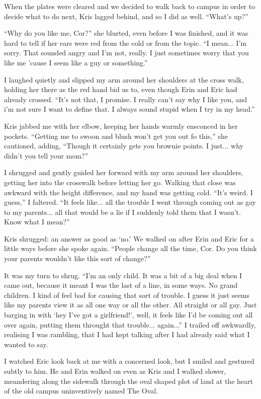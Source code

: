 When the plates were cleared and we decided to walk back to campus in order to decide what to do next, Kris lagged behind, and so I did as well.  ``What's up?''

``Why do you like me, Cor?'' she blurted, even before I was finished, and it was hard to tell if her ears were red from the cold or from the topic.  ``I mean... I'm sorry.  That sounded angry and I'm not, really.  I just sometimes worry that you like me 'cause I seem like a guy or something.''

I laughed quietly and slipped my arm around her shoulders at the cross walk, holding her there as the red hand bid us to, even though Erin and Eric had already crossed.  ``It's not that, I promise.  I really can't say why I like you, and i'm not sure I want to define that.  I always sound stupid when I try in my head.''

Kris jabbed me with her elbow, keeping her hands warmly ensconced in her pockets.  ``Getting me to swoon and blush won't get you out fo this,'' she cautioned, adding, ``Though it certainly gets you brownie points.  I just... why didn't you tell your mom?''

I shrugged and gently guided her forward with my arm around her shoulders, getting her into the crosswalk before letting her go.  Walking that close was awkward with the height difference, and my hand was getting cold.  ``It's weird.  I guess,'' I faltered.  ``It feels like... all the trouble I went through coming out as gay to my parents... all that would be a lie if I suddenly told them that I wasn't.  Know what I mean?''

Kris shrugged: an answer as good as `no.'  We walked on after Erin and Eric for a little ways before she spoke again.  ``People change all the time, Cor.  Do you think your parents wouldn't like this sort of change?''

It was my turn to shrug.  ``I'm an only child.  It was a bit of a big deal when I came out, because it meant I was the last of a line, in some ways.  No grand children.  I kind of feel bad for causing that sort of trouble.  I guess it just seems like my parents view it as all one way or all the other.  All straight or all gay.  Just barging in with `hey I've got a girlfriend!', well, it feels like I'd be coming out all over again, putting them throught that trouble... again...''  I trailed off awkwardly, realising I was rambling, that I had kept talking after I had already said what I wanted to say.

I watched Eric look back at me with a concerned look, but I smiled and gestured subtly to him.  He and Erin walked on even as Kris and I walked slower, meandering along the sidewalk through the oval shaped plot of land at the heart of the old campus uninventively named The Oval.

